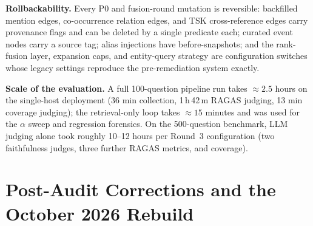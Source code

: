 \textbf{Rollbackability.} Every P0 and fusion-round mutation is
reversible: backfilled mention edges, co-occurrence relation edges, and
TSK cross-reference edges carry provenance flags and can be deleted by
a single predicate each; curated event nodes carry a source tag;
alias injections have before-snapshots; and the rank-fusion layer,
expansion caps, and entity-query strategy are configuration switches
whose legacy settings reproduce the pre-remediation system exactly.

\textbf{Scale of the evaluation.} A full 100-question pipeline run
takes $\approx 2.5$ hours on the single-host deployment (36 min
collection, 1\,h\,42\,m RAGAS judging, 13 min coverage judging); the
retrieval-only loop takes $\approx 15$ minutes and was used for the
$\alpha$ sweep and regression forensics. On the 500-question benchmark,
LLM judging alone took roughly 10--12 hours per Round~3 configuration
(two faithfulness judges, three further RAGAS metrics, and coverage).

\section{Post-Audit Corrections and the October 2026 Rebuild}
\label{app:rebuild}

